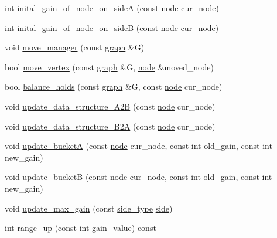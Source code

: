 \begin{DoxyCompactItemize}
\item 
int \mbox{\hyperlink{classfm__partition_a50c61b9d27e83a98e2e04a47b51670b6}{inital\+\_\+gain\+\_\+of\+\_\+node\+\_\+on\+\_\+sideA}} (const \mbox{\hyperlink{classnode}{node}} cur\+\_\+node)
\item 
int \mbox{\hyperlink{classfm__partition_aa217da6a3c8a736e9e51aa348c951501}{inital\+\_\+gain\+\_\+of\+\_\+node\+\_\+on\+\_\+sideB}} (const \mbox{\hyperlink{classnode}{node}} cur\+\_\+node)
\item 
void \mbox{\hyperlink{classfm__partition_a91572409b30f0967ea3782079f69b1bb}{move\+\_\+manager}} (const \mbox{\hyperlink{classgraph}{graph}} \&G)
\item 
bool \mbox{\hyperlink{classfm__partition_ac1167c6595a9f582ae98c9f555029d9b}{move\+\_\+vertex}} (const \mbox{\hyperlink{classgraph}{graph}} \&G, \mbox{\hyperlink{classnode}{node}} \&moved\+\_\+node)
\item 
bool \mbox{\hyperlink{classfm__partition_a6dc702df474c4ce60e80b3e5a93b7f4d}{balance\+\_\+holds}} (const \mbox{\hyperlink{classgraph}{graph}} \&G, const \mbox{\hyperlink{classnode}{node}} cur\+\_\+node)
\item 
void \mbox{\hyperlink{classfm__partition_a8bd7f2715334e9ec95da8001117fdde5}{update\+\_\+data\+\_\+structure\+\_\+\+A2B}} (const \mbox{\hyperlink{classnode}{node}} cur\+\_\+node)
\item 
void \mbox{\hyperlink{classfm__partition_a783174f29d49e7e1ae7f6cf71faa82fb}{update\+\_\+data\+\_\+structure\+\_\+\+B2A}} (const \mbox{\hyperlink{classnode}{node}} cur\+\_\+node)
\item 
void \mbox{\hyperlink{classfm__partition_aa4ec83c52916cc6cac23e7a9987427cd}{update\+\_\+bucketA}} (const \mbox{\hyperlink{classnode}{node}} cur\+\_\+node, const int old\+\_\+gain, const int new\+\_\+gain)
\item 
void \mbox{\hyperlink{classfm__partition_a270d469ca584ed9adff9fced67743679}{update\+\_\+bucketB}} (const \mbox{\hyperlink{classnode}{node}} cur\+\_\+node, const int old\+\_\+gain, const int new\+\_\+gain)
\item 
void \mbox{\hyperlink{classfm__partition_a335722b73c1d6f02d1083e76a3937b01}{update\+\_\+max\+\_\+gain}} (const \mbox{\hyperlink{classfm__partition_a7cdff1bea3740a287387e8408e16ca79}{side\+\_\+type}} \mbox{\hyperlink{classfm__partition_af83309e781e9658fc0ff923ced087bfc}{side}})
\item 
int \mbox{\hyperlink{classfm__partition_ac49d477ecbf512fa375b76a472ec54f8}{range\+\_\+up}} (const int \mbox{\hyperlink{classfm__partition_ae8176f4ce82305abfd58e519d2cdd91d}{gain\+\_\+value}}) const

\end{DoxyCompactItemize}

